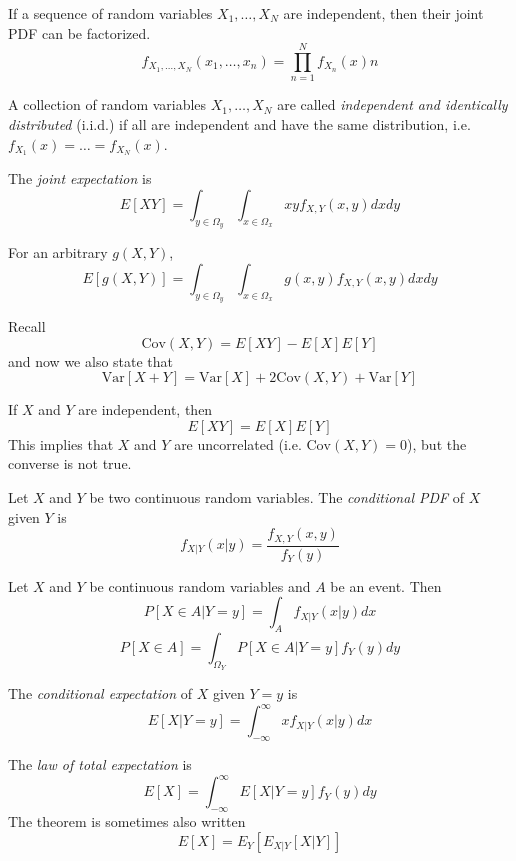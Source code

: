 If a sequence of random variables
$X_1, \dots, X_N$ are independent,
then their joint PDF can be factorized.
\begin{equation}
    f_{X_1,\dots,X_N}(x_1,\dots,x_n) = \prod_{n=1}^{N}f_{X_n}(x)n
\end{equation}

A collection of random variables $X_1, \dots, X_N$ are called
\emph{independent and identically distributed} (i.i.d.) if
all are independent and have the same distribution, i.e.
$f_{X_1}(x) = \dots = f_{X_N}(x)$.

The \emph{joint expectation} is
\begin{equation}
    E[XY] = \int_{y\in \Omega_y}\int_{x\in \Omega_x} xy f_{X,Y}(x,y)dxdy
\end{equation}

For an arbitrary $g(X,Y)$,
\begin{equation}
    E[g(X,Y)] = \int_{y\in \Omega_y}\int_{x\in \Omega_x} g(x,y) f_{X,Y}(x,y)dxdy
\end{equation}

Recall
\begin{equation}
    \text{Cov}(X,Y) = E[XY] - E[X]E[Y]
\end{equation}
and now we also state that
\begin{equation}
    \text{Var}[X+Y] = \text{Var}[X] + 2\text{Cov}(X,Y) + \text{Var}[Y]
\end{equation}

If $X$ and $Y$ are independent, then
\begin{equation}
    E[XY] = E[X]E[Y]
\end{equation}
This implies that $X$ and $Y$ are
uncorrelated (i.e. $\text{Cov}(X,Y) = 0$),
but the converse is not true.

Let $X$ and $Y$ be two continuous random variables.
The \emph{conditional PDF} of $X$ given $Y$ is
\begin{equation}
    f_{X|Y}(x|y) = \frac{f_{X,Y}(x,y)}{f_Y(y)}
\end{equation}

Let $X$ and $Y$ be continuous random variables and
$A$ be an event. Then
\begin{equation}
    P[X \in A | Y=y] = \int_{A} f_{X|Y}(x|y)dx
\end{equation}
\begin{equation}
    P[X\in A] = \int_{\Omega_Y} P[X\in A|Y = y]f_Y(y)dy
\end{equation}

The \emph{conditional expectation} of $X$ given $Y=y$ is
\begin{equation}
    E[X|Y=y] = \int_{-\infty}^{\infty}xf_{X|Y}(x|y)dx
\end{equation}

The \emph{law of total expectation} is
\begin{equation}
    E[X] = \int_{-\infty}^{\infty} E[X|Y=y]f_Y(y)dy
\end{equation}
The theorem is sometimes also written
\begin{equation}
    E[X] = E_Y[E_{X|Y}[X|Y]]
\end{equation}